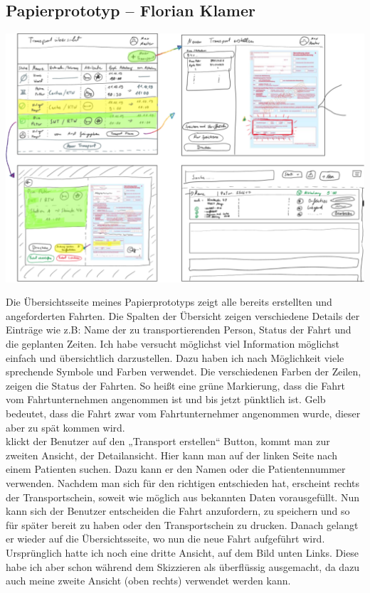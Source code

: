 \documentclass[a4paper, ngerman, 12pt]{scrartcl}
\begin{document}
\subsection{Papierprototyp – Florian Klamer}
\begin{center}
\begin{minipage}[b]{0.7\textwidth}
	\centering
	\includegraphics[width=\textwidth]{Bilder/prototypFlo.pdf}
	\label{img:klamer}
\end{minipage}
\end{center}
Die Übersichtsseite meines Papierprototyps zeigt alle bereits erstellten und angeforderten Fahrten. Die Spalten der Übersicht zeigen verschiedene Details der Einträge wie z.B: Name der zu transportierenden Person, Status der Fahrt und die geplanten Zeiten. Ich habe versucht möglichst viel Information möglichst einfach und übersichtlich darzustellen. Dazu haben ich nach Möglichkeit viele sprechende Symbole und Farben verwendet. Die verschiedenen Farben der Zeilen, zeigen die Status der Fahrten. So heißt eine grüne Markierung, dass die Fahrt vom Fahrtunternehmen angenommen ist und bis jetzt pünktlich ist. Gelb bedeutet, dass die Fahrt zwar vom Fahrtunternehmer angenommen wurde, dieser aber zu spät kommen wird.\\
klickt der Benutzer auf den „Transport erstellen“ Button, kommt man zur zweiten Ansicht, der Detailansicht. Hier kann man auf der linken Seite nach einem Patienten suchen. Dazu kann er den Namen oder die Patientennummer verwenden. Nachdem man sich für den richtigen entschieden hat, erscheint rechts der Transportschein, soweit wie möglich aus bekannten Daten vorausgefüllt. Nun kann sich der Benutzer entscheiden die Fahrt anzufordern, zu speichern und so für später bereit zu haben oder den Transportschein zu drucken. Danach gelangt er wieder auf die Übersichtsseite, wo nun die neue Fahrt aufgeführt wird.\\
Ursprünglich hatte ich noch eine dritte Ansicht, auf dem Bild unten Links. Diese habe ich aber schon während dem Skizzieren als überflüssig ausgemacht, da dazu auch meine zweite Ansicht (oben rechts) verwendet werden kann.
\end{document}
